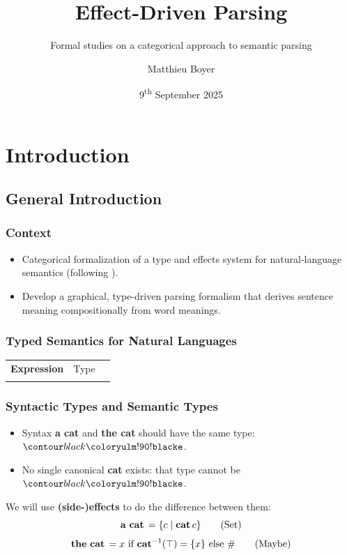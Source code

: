 \documentclass[math, english, info]{beamercours}
\title{Effect-Driven Parsing}
\subtitle{Formal studies on a categorical approach to semantic parsing}
\institute{École Normale Supérieure | Yale University}
\author{Matthieu Boyer}
\date{9\textsuperscript{th} September 2025}
\begin{document}
\fancytitleframe

\section{Introduction}
\subsection{General Introduction}
\begin{frame}
	\frametitle{Context}
	\begin{itemize}
		\item Categorical formalization of a type and effects system for
		      natural-language semantics
		      (following \cite{bumfordEffectdrivenInterpretationFunctors2025}).

		\item Develop a graphical, type-driven parsing formalism that
		      derives sentence meaning compositionally from word meanings.
	\end{itemize}
\end{frame}

\begin{frame}[fragile]
	\frametitle{Typed Semantics for Natural Languages}
	\begin{center}
		\setcellgapes{3pt}
		\makegapedcells
		\begin{NiceTabular}{>{\bf}LLL}
			Expression & \rm Type & \lambda{} \\
			\CodeAfter
		\end{NiceTabular}
	\end{center}
\end{frame}

\begin{frame}[fragile]
	\frametitle{Syntactic Types and Semantic Types}
	\begin{itemize}
		\item Syntax \textbf{a cat} and \textbf{the cat} should have the same type: $\e$.
		      \pause
		\item No single canonical \textbf{cat} exists: that type cannot be $\e$.
	\end{itemize}
	\pause

	We will use \textbf{(side-)effects} to do the difference between them:
	\begin{equation*}
		\mathbf{a\ cat}\, = \{c \mid \mathbf{cat}\, c\} \tag{Set}
	\end{equation*}
	\begin{equation*}
		\mathbf{the\ cat}\, = x \text{ if } \mathbf{cat}^{-1}(\top) = \{x\} \text{ else } \# \tag{Maybe}
	\end{equation*}
\end{frame}
\end{document}
